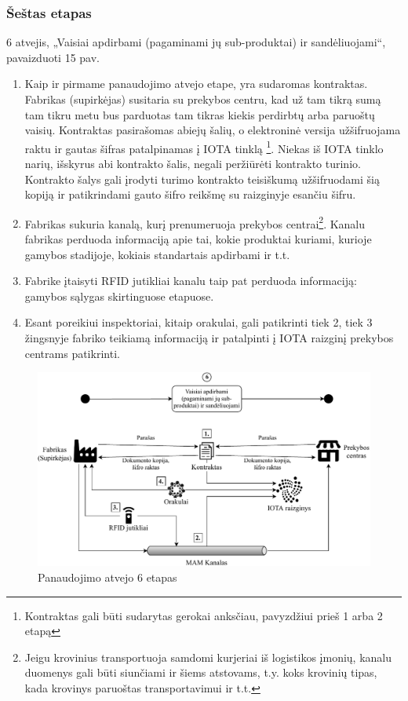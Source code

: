 
\subsubsection{Šeštas etapas}

6 atvejis, „Vaisiai apdirbami (pagaminami jų sub-produktai) ir sandėliuojami“, pavaizduoti 15 pav.
\begin{enumerate}
    \item Kaip ir pirmame panaudojimo atvejo etape, yra sudaromas kontraktas. Fabrikas (supirkėjas) susitaria su prekybos centru, kad už tam tikrą sumą tam tikru metu bus parduotas tam tikras kiekis perdirbtų arba paruoštų vaisių. Kontraktas pasirašomas abiejų šalių, o elektroninė versija užšifruojama raktu ir gautas šifras patalpinamas į IOTA tinklą \footnote{Kontraktas gali būti sudarytas gerokai anksčiau, pavyzdžiui prieš 1 arba 2 etapą}. Niekas iš IOTA tinklo narių, išskyrus abi kontrakto šalis, negali peržiūrėti kontrakto turinio. Kontrakto šalys gali įrodyti turimo kontrakto teisiškumą užšifruodami šią kopiją ir patikrindami gauto šifro reikšmę su raizginyje esančiu šifru.
    \item Fabrikas sukuria kanalą, kurį prenumeruoja prekybos centrai\footnote{Jeigu krovinius transportuoja samdomi kurjeriai iš logistikos įmonių, kanalu duomenys gali būti siunčiami ir šiems atstovams, t.y. koks krovinių tipas, kada krovinys paruoštas transportavimui ir t.t.}. Kanalu fabrikas perduoda informaciją apie tai, kokie produktai kuriami, kurioje gamybos stadijoje, kokiais standartais apdirbami ir t.t.
    \item Fabrike įtaisyti RFID jutikliai kanalu taip pat perduoda informaciją: gamybos sąlygas skirtinguose etapuose.
    \item Esant poreikiui inspektoriai, kitaip orakulai, gali patikrinti tiek 2, tiek 3 žingsnyje fabriko teikiamą informaciją ir patalpinti į IOTA raizginį prekybos centrams patikrinti.
\end{enumerate}

\begin{figure}[H]
    \centering
    \includegraphics[scale=0.7]{images/iota-usecase-6}
    \caption{Panaudojimo atvejo 6 etapas}
\end{figure}



